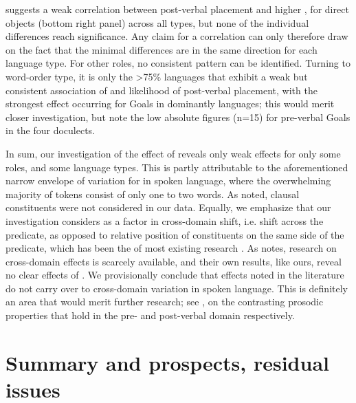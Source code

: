 \documentclass[output=paper,colorlinks,citecolor=brown,collectionchapter]{langscibook}
\begin{document}
\begin{sloppypar}
 suggests a weak correlation between post-verbal placement and higher , for direct objects (bottom right panel) across all  types, but none of the individual differences reach significance. Any claim for a correlation can only therefore draw on the fact that the minimal differences are in the same direction for each language type. For other roles, no consistent pattern can be identified. Turning to word-order type, it is only the >75\%  languages that exhibit a weak but consistent association of  and likelihood of post-verbal placement, with the strongest effect occurring for Goals in dominantly  languages; this would merit closer investigation, but note the low absolute figures (n=15) for pre-verbal Goals in the four  doculects.
\end{sloppypar}

In sum, our investigation of the effect of  reveals only weak effects for only some roles, and some language types. This is partly attributable to the aforementioned narrow envelope of variation for  in spoken language, where the overwhelming majority of tokens consist of only one to two words. As noted, clausal constituents were not considered in our data. Equally, we emphasize that our investigation considers  as a factor in cross-domain shift, i.e. shift across the predicate, as opposed to relative position of constituents on the same side of the predicate, which has been the  of most existing research \citep[see][]{wasow_factors_2022}. As \citet{yao_np_2018} notes, research on cross-domain  effects is scarcely available, and their own results, like ours, reveal no clear  effects of . We provisionally conclude that  effects noted in the literature do not carry over to cross-domain  variation in spoken language. This is definitely an area that would merit further research; see , on the contrasting prosodic properties that hold in the pre- and post-verbal domain respectively.

\section{Summary and prospects, residual issues}\label{Intro:ss:6}
\end{document}
